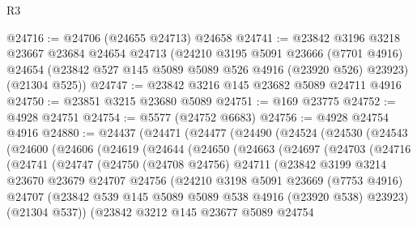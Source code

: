 \begin{lexlean}{R3}
\begin{coremodule}
@24716 := @24706 (@24655 @24713) @24658
@24741 := @23842
    @3196
    @3218
    @23667
    @23684
    @24654
    @24713
    (@24210
      @3195
      @5091
      @23666
      (@7701 @4916)
      @24654
      (@23842 @527 @145 @5089 @5089 @526 @4916 (@23920 @526) @23923)
      (@21304 @525))
@24747 := @23842 @3216 @145 @23682 @5089 @24711 @4916
@24750 := @23851 @3215 @23680 @5089
@24751 := @169 @23775
@24752 := @4928 @24751
@24754 := @5577 (@24752 @6683)
@24756 := @4928 @24754 @4916
@24880 := @24437
    (@24471
      (@24477
        (@24490
          (@24524
            (@24530
              (@24543
                (@24600
                  (@24606
                    (@24619
                      (@24644
                        (@24650
                          (@24663
                            (@24697
                              (@24703
                                (@24716
                                  (@24741
                                    (@24747
                                      (@24750
                                        (@24708 @24756)
                                        @24711
                                        (@23842
                                          @3199
                                          @3214
                                          @23670
                                          @23679
                                          @24707
                                          @24756
                                          (@24210
                                            @3198
                                            @5091
                                            @23669
                                            (@7753 @4916)
                                            @24707
                                            (@23842
                                              @539
                                              @145
                                              @5089
                                              @5089
                                              @538
                                              @4916
                                              (@23920 @538)
                                              @23923)
                                            (@21304 @537))
                                          (@23842
                                            @3212
                                            @145
                                            @23677
                                            @5089
                                            @24754

\end{coremodule}
\end{lexlean}

